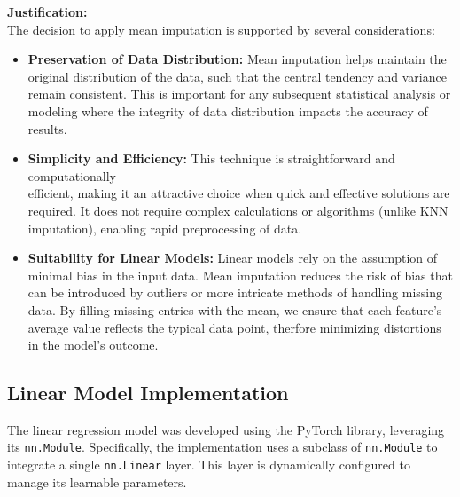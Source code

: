\documentclass[11pt,a4paper]{article}
\begin{document}
\vspace*{11pt}
\noindent \textbf{Justification:}\\
The decision to apply mean imputation is supported by several considerations:
\begin{itemize}
    \item \textbf{Preservation of Data Distribution:} Mean imputation helps maintain the original distribution of the data,
          such that the central tendency and variance remain consistent. This is important for any subsequent statistical analysis or
          modeling where the integrity of data distribution impacts the accuracy of results.
    \item \textbf{Simplicity and Efficiency:} This technique is straightforward and computationally \\ efficient, making it an
          attractive choice when quick and effective solutions are required. It does not require complex calculations or
          algorithms (unlike KNN imputation), enabling rapid preprocessing of data.
    \item \textbf{Suitability for Linear Models:} Linear models rely on the assumption of minimal bias in the input data.
          Mean imputation reduces the risk of bias that can be introduced by outliers or more intricate methods of handling missing data.
          By filling missing entries with the mean, we ensure that each feature's average value reflects the typical data point,
          therfore minimizing distortions in the model’s outcome.
\end{itemize}
\newpage
\subsection*{Linear Model Implementation}
The linear regression model was developed using the PyTorch library, leveraging its \texttt{nn.Module}.
Specifically, the implementation uses a subclass of \texttt{nn.Module} to integrate a single \texttt{nn.Linear} layer.
This layer is dynamically configured to manage its learnable parameters.
\end{document}
